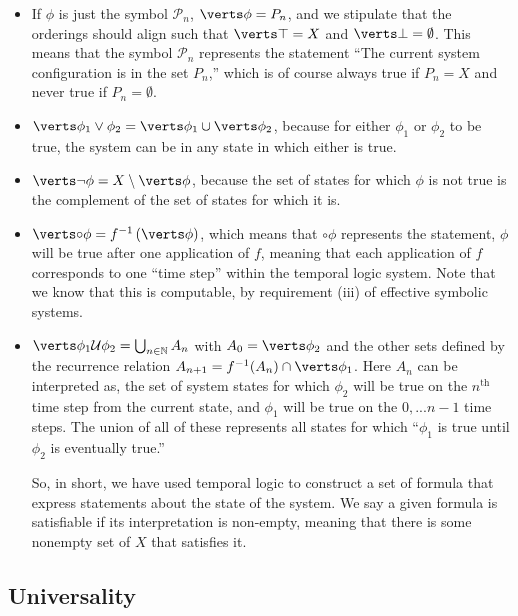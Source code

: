 \documentclass{fkpaper}
\newcommand{\lnext}{\circ}
\newcommand{\ltil}{\mathcal{U}}
\newcommand{\psc}{\mathcal{P}}
\renewcommand{\Nn}{\mathbb{N}}
\begin{document}
\begin{multicols}{2}
\begin{itemize}
  \item If $\phi$ is just the symbol $\psc_n$, $\abs{\phi} = P_n$, and we stipulate that the orderings should align such that $\abs{\top} = X$ and $\abs{\bot} = \emptyset$. This means that the symbol $\psc_n$ represents the statement ``The current system configuration is in the set $P_n$,'' which is of course always true if $P_n = X$ and never true if $P_n = \emptyset$.

  \item $\abs{\phi_1 \lor \phi_2} = \abs{\phi_1} \cup \abs{\phi_2}$, because for either $\phi_1$ or $\phi_2$ to be true, the system can be in any state in which either is true.

  \item $\abs{\lnot \phi} = X \setminus \abs{\phi}$, because the set of states for which $\phi$ is not true is the complement of the set of states for which it is.

  \item $\abs{\lnext \phi} = f^{-1}\left( \abs{\phi} \right)$, which means that $\lnext \phi$ represents the statement, $\phi$ will be true after one application of $f$, meaning that each application of $f$ corresponds to one ``time step'' within the temporal logic system. Note that we know that this is computable, by requirement (iii) of effective symbolic systems.

  \item $\abs{\phi_1 \ltil \phi_2} = \bigcup_{n \in \Nn} A_n$ with $A_0 = \abs{\phi_2}$ and the other sets defined by the recurrence relation $A_{n+1} = f^{-1}(A_n)\cap\abs{\phi_1}$. Here $A_n$ can be interpreted as, the set of system states for which $\phi_2$ will be true on the $n^{\text{th}}$ time step from the current state, and $\phi_1$ will be true on the $0,...n-1$ time steps. The union of all of these represents all states for which ``$\phi_1$ is true until $\phi_2$ is eventually true.''

    So, in short, we have used temporal logic to construct a set of formula that express statements about the state of the system. We say a given formula is satisfiable if its interpretation is non-empty, meaning that there is some nonempty set of $X$ that satisfies it.

\end{itemize}


\subsection{Universality}


\end{multicols}
\end{document}
